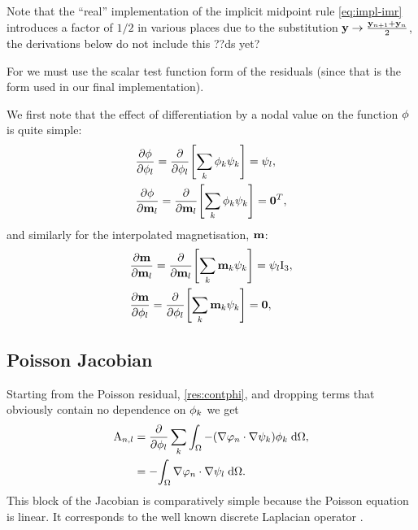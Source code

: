Note that the ``real'' implementation of the implicit midpoint rule \cref{eq:impl-imr} introduces a factor of $1/2$ in various places due to the substitution $ \mathbf{y} \rightarrow \frac{\mathbf{y}_{n+1} + \mathbf{y}_n}{2}$, the derivations below do not include this ??ds yet?

For  we must use the scalar test function form of the residuals (since that is the form used in our final implementation).

We first note that the effect of differentiation by a nodal value on the function $\phi$ is quite simple:
\begin{equation}
  \begin{aligned}
    &\frac{\partial \phi}{\partial \phi_l} = \frac{\partial }{\partial \phi_l} {\left[  \sum_k \phi_k {\psi_k}  \right]} = \psi_l, \\
    &\frac{\partial \phi}{\partial \mathbf{m}_l} = \frac{\partial }{\partial \mathbf{m}_l} {\left[  \sum_k \phi_k {\psi_k}  \right]} = \mathbf{0}^T, \\
  \end{aligned}
\end{equation}
and similarly for the interpolated magnetisation, $\mathbf{m}$:
\begin{equation}
  \begin{aligned}
    &\frac{\partial \mathbf{m}}{\partial \mathbf{m}_l} = \frac{\partial }{\partial \mathbf{m}_l} {\left[  \sum_k \mathbf{m}_k {\psi_k}  \right]} = \psi_l \text{I}_3, \\
    &\frac{\partial \mathbf{m}}{\partial \phi_l} = \frac{\partial }{\partial \phi_l} {\left[  \sum_k \mathbf{m}_k {\psi_k}  \right]} = \mathbf{0}, \\
\end{aligned} 
\end{equation}

\subsection{Poisson Jacobian}
\label{sec:poisson-jacobian}

Starting from the Poisson residual, \cref{res:contphi}, and dropping terms that obviously contain no dependence on $\phi_k$ we get
\begin{equation}
  \begin{aligned}
    \label{eq:poisson-jacobian}
    \mathrm{A}_{n,l} &= \frac{\partial }{\partial \phi_{l}} \sum_k {\int_{\Omega} { -(\nabla \varphi_n \cdot \nabla \psi_k) \phi_{k}} {\; \mathrm{{d}}} {\Omega}}, \\
    &= -{\int_{\Omega} {\nabla \varphi_n \cdot \nabla \psi_l} {\; \mathrm{{d}}} {\Omega}}.
  \end{aligned}
\end{equation}
This block of the Jacobian is comparatively simple because the Poisson equation is linear. 
It corresponds to the well known discrete Laplacian operator \cite{HowardElmanDavidSilvester2006}.


